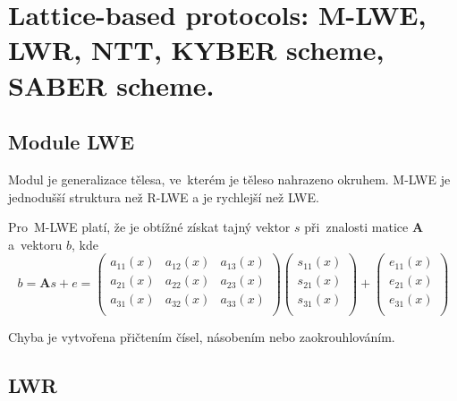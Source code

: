 \clearpage
\section{Lattice-based protocols: M-LWE, LWR, NTT, KYBER scheme, SABER scheme.}

\subsection{Module LWE}

Modul je generalizace tělesa, ve~kterém je těleso\footnotemark{} nahrazeno okruhem\footnotemark{}.
M-LWE je jednodušší struktura než R-LWE a je rychlejší než LWE.

Pro~M-LWE platí, že je obtížné získat tajný vektor $s$ při~znalosti matice \textbf{A} a~vektoru $b$, kde
$$
b =
\textbf{A}s + e =
\left(\begin{matrix}
a_{11}(x) & a_{12}(x) & a_{13}(x) \\
a_{21}(x) & a_{22}(x) & a_{23}(x) \\
a_{31}(x) & a_{32}(x) & a_{33}(x) \\
\end{matrix}\right) \left(\begin{matrix}
s_{11}(x) \\ s_{21}(x) \\ s_{31}(x) \\
\end{matrix}\right) + \left(\begin{matrix}
e_{11}(x) \\ e_{21}(x) \\ e_{31}(x) \\
\end{matrix}\right)
$$

Chyba je vytvořena přičtením čísel, násobením nebo zaokrouhlováním.


\subsection{LWR}

